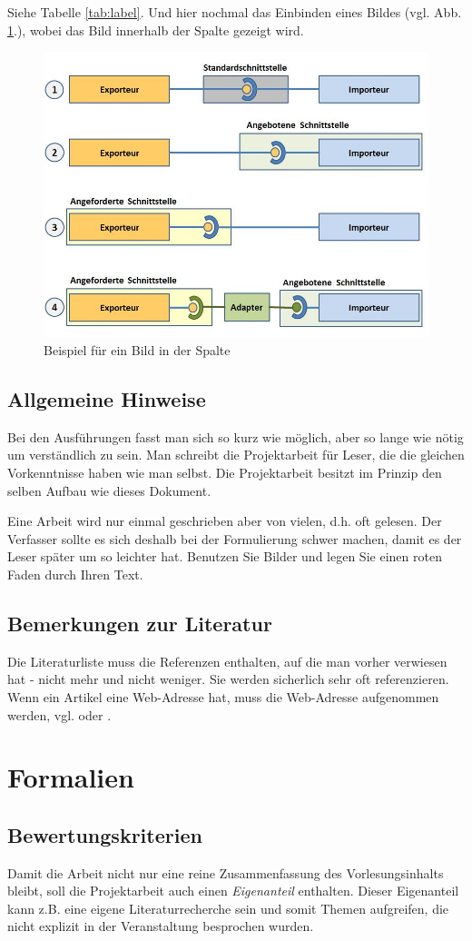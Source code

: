 \documentclass[fleqn,10pt,ngerman]{SelfArx}
\begin{document}
Siehe Tabelle \ref{tab:label}.
Und hier nochmal das Einbinden eines Bildes (vgl. Abb. \ref{fig:Schnittstellen}.), wobei das Bild innerhalb der Spalte gezeigt wird.


\begin{figure}[ht]\centering
	\includegraphics[width=5 cm]{Abbildungen/Schnittstellen}
	\caption{Beispiel für ein Bild in der Spalte}
	\label{fig:Schnittstellen}
\end{figure}

\subsection{Allgemeine Hinweise}
Bei den Ausführungen fasst man sich so kurz wie möglich, aber so lange wie nötig um verständlich zu sein. Man schreibt die Projektarbeit für Leser, die die gleichen Vorkenntnisse haben wie man selbst.
Die Projektarbeit besitzt im Prinzip den selben Aufbau wie dieses Dokument.

Eine Arbeit wird nur einmal geschrieben aber von vielen, d.h. oft gelesen. Der Verfasser sollte es sich deshalb bei der Formulierung schwer machen, damit es der Leser später um so leichter hat. Benutzen Sie Bilder und legen Sie einen roten Faden durch Ihren Text.

\subsection{Bemerkungen zur Literatur}
Die Literaturliste muss die Referenzen enthalten, auf die man vorher verwiesen hat - nicht mehr und nicht weniger. Sie werden sicherlich sehr oft referenzieren. Wenn ein Artikel eine Web-Adresse hat, muss die Web-Adresse aufgenommen werden, vgl. \cite{RobertMartinOOMetrics} oder \cite{RobertMartinSOLID}.






\section{Formalien}
\subsection{Bewertungskriterien}
Damit die Arbeit nicht nur eine reine Zusammenfassung des Vorlesungsinhalts bleibt, soll die Projektarbeit auch einen {\it Eigenanteil} enthalten. Dieser Eigenanteil kann z.B. eine eigene Literaturrecherche sein und somit Themen aufgreifen, die nicht explizit in der Veranstaltung besprochen wurden.
\end{document}
